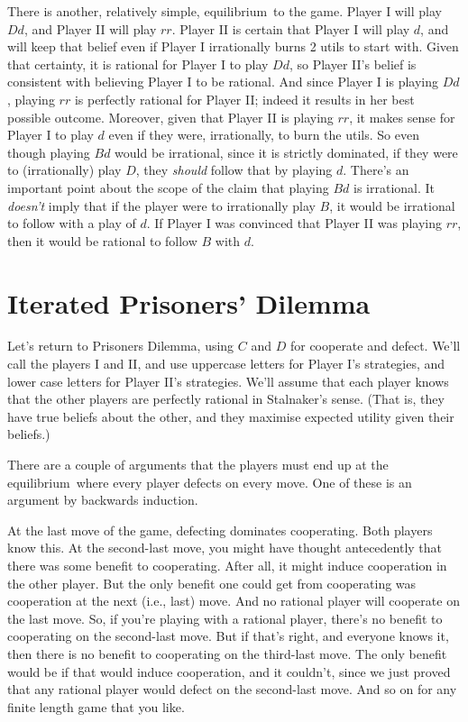 \documentclass[openany]{book}
\newcommand{\eqm}{equilibrium}
\begin{document}
There is another, relatively simple, \eqm\ to the game. Player I will play $Dd$, and Player II will play $rr$. Player II is certain that Player I will play $d$, and will keep that belief even if Player I irrationally burns 2 utils to start with. Given that certainty, it is rational for Player I to play $Dd$, so Player II's belief is consistent with believing Player I to be rational. And since Player I is playing $Dd$, playing $rr$ is perfectly rational for Player II; indeed it results in her best possible outcome. Moreover, given that Player II is playing $rr$, it makes sense for Player I to play $d$ even if they were, irrationally, to burn the utils. So even though playing $Bd$ would be irrational, since it is strictly dominated, if they were to (irrationally) play $D$, they \textit{should} follow that by playing $d$. There's an important point about the scope of the claim that playing $Bd$ is irrational. It \textit{doesn't} imply that if the player were to irrationally play $B$, it would be irrational to follow with a play of $d$. If Player I was convinced that Player II was playing $rr$, then it would be rational to follow $B$ with $d$.

\section*{Iterated Prisoners' Dilemma}
Let's return to Prisoners Dilemma, using $C$ and $D$ for cooperate and defect. We'll call the players I and II, and use uppercase letters for Player I's strategies, and lower case letters for Player II's strategies. We'll assume that each player knows that the other players are perfectly rational in Stalnaker's sense. (That is, they have true beliefs about the other, and they maximise expected utility given their beliefs.)

There are a couple of arguments that the players must end up at the \eqm\ where every player defects on every move. One of these is an argument by backwards induction. 

At the last move of the game, defecting dominates cooperating. Both players know this. At the second-last move, you might have thought antecedently that there was some benefit to cooperating. After all, it might induce cooperation in the other player. But the only benefit one could get from cooperating was cooperation at the next (i.e., last) move. And no rational player will cooperate on the last move. So, if you're playing with a rational player, there's no benefit to cooperating on the second-last move. But if that's right, and everyone knows it, then there is no benefit to cooperating on the third-last move. The only benefit would be if that would induce cooperation, and it couldn't, since we just proved that any rational player would defect on the second-last move. And so on for any finite length game that you like.
\end{document}
